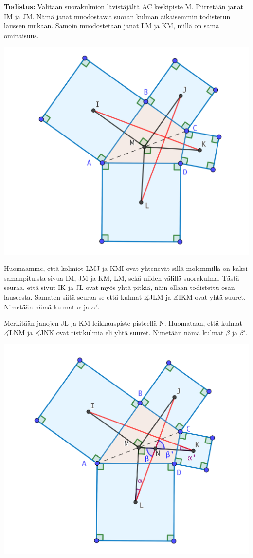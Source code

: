 \documentclass{scrartcl}
\begin{document}
\medskip
\textbf{Todistus:} Valitaan suorakulmion lävistäjältä AC keskipiste M. Piirretään janat IM ja JM. Nämä janat muodostavat suoran kulman aikaisemmin todistetun lauseen mukaan. Samoin muodostetaan janat LM ja KM, niillä on sama ominaisuus.
\begin{center}
    \includegraphics[scale=0.3]{todistus1}
\end{center}
Huomaamme, että kolmiot LMJ ja KMI ovat yhtenevät sillä molemmilla on kaksi samanpituista sivua IM, JM ja KM, LM, sekä niiden välillä suorakulma. Tästä seuraa, että sivut IK ja JL ovat myös yhtä pitkiä, näin ollaan todistettu osan lauseesta. Samaten siitä seuraa se että kulmat $\measuredangle$JLM ja $\measuredangle$IKM ovat yhtä suuret. Nimetään nämä kulmat $\alpha$ ja $\alpha'$.

Merkitään janojen JL ja KM leikkauspiste pisteellä N. Huomataan, että kulmat $\measuredangle$LNM ja $\measuredangle$JNK ovat ristikulmia eli yhtä suuret. Nimetään nämä kulmat $\beta$ ja $\beta'$.

\begin{center}
    \includegraphics[scale=0.3]{todistuksenjatkoa.png}
\end{center}
\end{document}
